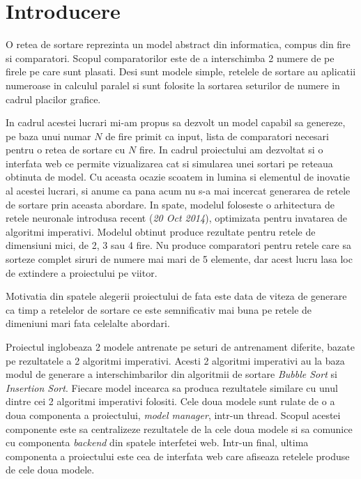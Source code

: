 \documentclass[12pt]{article}
\begin{document}
\vspace{80mm}

\pagebreak

\section{Introducere}

O retea de sortare reprezinta un model abstract din informatica, compus din fire si comparatori. Scopul comparatorilor este de a interschimba 2 numere de pe firele pe care sunt plasati. Desi sunt modele simple, retelele de sortare au aplicatii numeroase in calculul paralel si sunt folosite la sortarea seturilor de numere in cadrul placilor grafice.
 
   In cadrul acestei lucrari mi-am propus sa dezvolt un model capabil sa genereze, pe baza unui numar $N$ de fire primit ca input, lista de comparatori necesari pentru o retea de sortare cu $N$ fire. In cadrul proiectului am dezvoltat si o interfata web ce permite vizualizarea cat si simularea unei sortari pe reteaua obtinuta de model. Cu aceasta ocazie scoatem in lumina si elementul de inovatie al acestei lucrari, si anume ca pana acum nu s-a mai incercat generarea de retele de sortare prin aceasta abordare. In spate, modelul foloseste o arhitectura de retele neuronale introdusa recent (\textit{20 Oct 2014}), optimizata pentru invatarea de algoritmi imperativi. Modelul obtinut produce rezultate pentru retele de dimensiuni mici, de 2, 3 sau 4 fire. Nu produce comparatori pentru retele care sa sorteze complet siruri de numere mai mari de 5 elemente, dar acest lucru lasa loc de extindere a proiectului pe viitor.

Motivatia din spatele alegerii proiectului de fata este data de viteza de generare ca timp a retelelor de sortare ce este semnificativ mai buna pe retele de dimeniuni mari fata celelalte abordari.

Proiectul inglobeaza 2 modele antrenate pe seturi de antrenament diferite, bazate pe rezultatele a 2 algoritmi imperativi. Acesti 2 algoritmi imperativi au la baza modul de generare a interschimbarilor din algoritmii de sortare \textit{Bubble Sort} si \textit{Insertion Sort}. Fiecare model incearca sa produca rezultatele similare cu unul dintre cei 2 algoritmi imperativi folositi. Cele doua modele sunt rulate de o a doua componenta a proiectului, \textit{model manager}, intr-un thread. Scopul acestei componente este sa centralizeze rezultatele de la cele doua modele si sa comunice cu componenta \textit{backend} din spatele interfetei web. Intr-un final, ultima componenta a proiectului este cea de interfata web care afiseaza retelele produse de cele doua modele.
\end{document}
